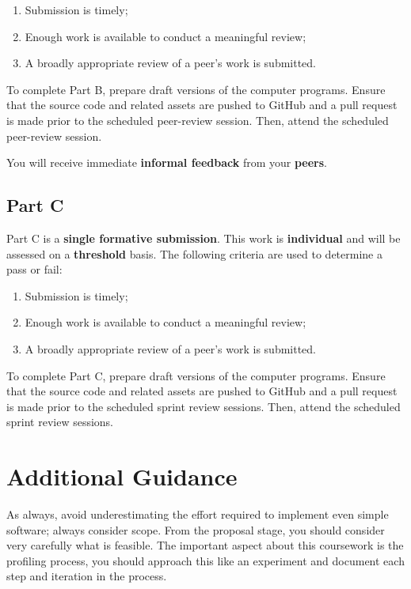\documentclass{../../fal_assignment}
\begin{document}
\begin{enumerate}[label=(\alph*)]
	\item Submission is timely;
	\item Enough work is available to conduct a meaningful review;
	\item A broadly appropriate review of a peer's work is submitted.
\end{enumerate}

To complete Part B, prepare draft versions of the computer programs. Ensure that the source code and related assets are pushed to GitHub and a pull request is made prior to the scheduled peer-review session. Then, attend the scheduled peer-review session.

You will receive immediate \textbf{informal feedback} from your \textbf{peers}.

\subsection*{Part C}

Part C is a \textbf{single formative submission}. This work is \textbf{individual} and will be assessed on a \textbf{threshold} basis. The following criteria are used to determine a pass or fail:

\begin{enumerate}[label=(\alph*)]
	\item Submission is timely;
	\item Enough work is available to conduct a meaningful review;
	\item A broadly appropriate review of a peer's work is submitted.
\end{enumerate}

To complete Part C, prepare draft versions of the computer programs. Ensure that the source code and related assets are pushed to GitHub and a pull request is made prior to the scheduled sprint review sessions. Then, attend the scheduled sprint review sessions.

\section*{Additional Guidance}

As always, avoid underestimating the effort required to implement even simple software; always consider scope.
From the proposal stage, you should consider very carefully what is feasible. The important aspect about this coursework is the profiling process, you should approach this like an experiment and document each step and iteration in the process.
\end{document}
